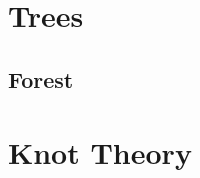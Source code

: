 \section{Trees} \label{sec:trees}

\subsection{Forest} \label{sec:forest}



\section{Knot Theory} \label{sec:knot_theory}
